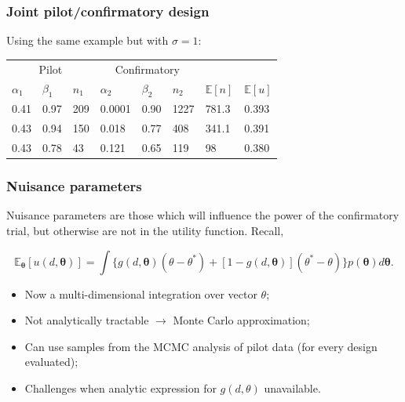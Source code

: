 \documentclass{beamer}
\begin{document}
\begin{frame}
\frametitle{Joint pilot/confirmatory design}
Using the same example but with $\sigma = 1$:\\\vspace{5mm}
\begin{tabular}{llllllll}
\toprule
\multicolumn{3}{c}{Pilot} & \multicolumn{3}{c}{Confirmatory} & & \\
$\alpha_{1}$ & $\beta_{1}$ & $n_{1}$ & $\alpha_{2}$ & $\beta_{2}$ & $n_{2}$ & $\mathbb{E}[n]$ & $\mathbb{E}[u]$   \\
\midrule
0.41 & 0.97 & 209 & 0.0001 & 0.90 & 1227 & 781.3 & 0.393 \\
0.43 & 0.94 & 150 & 0.018 & 0.77 & 408 & 341.1 & 0.391 \\
0.43 & 0.78 & 43 & 0.121 & 0.65 & 119 & 98 & 0.380 \\
\bottomrule
\end{tabular}
\end{frame}

\begin{frame}
\frametitle{Nuisance parameters}
Nuisance parameters are those which will influence the power of the confirmatory trial, but otherwise are not in the utility function. Recall,

\begin{equation}
\mathbb{E}_{\mathbf{\theta}}[u(d, \mathbf{\theta})] = \int \{g(d, \mathbf{\theta})(\theta - \theta^{*}) + [1- g(d, \mathbf{\theta})](\theta^{*} - \theta)\}p(\mathbf{\theta}) d\mathbf{\theta}.
\end{equation}

\begin{itemize}
\item Now a multi-dimensional integration over vector $\theta$;
\item Not analytically tractable $\rightarrow$ Monte Carlo approximation;
\item Can use samples from the MCMC analysis of pilot data (for every design evaluated);
\item Challenges when analytic expression for $g(d, \theta)$ unavailable.
\end{itemize}

\end{frame}
\end{document}
